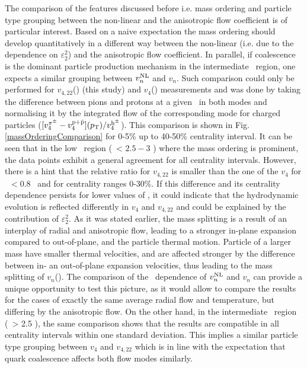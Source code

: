 The comparison of the features discussed before i.e. mass ordering and particle type grouping between the non-linear and the anisotropic flow coefficient is of particular interest.  Based on a naive expectation the mass ordering should develop quantitatively in a different way between the non-linear (i.e. due to the dependence on $\varepsilon_{2}^{2}$) and the anisotropic flow coefficient. In parallel, if coalescence is the dominant particle production mechanism in the intermediate \pT~region, one expects a similar grouping between $v_{n}^{\rm NL}$ and $v_{n}$. Such comparison could only be performed for $v_{4,22}$(\pT) (this study) and $v_{4}$(\pT) measurements \cite{Acharya:2018zuq} and was done by taking the difference between pions and protons at a given \pT~in both modes and normalising it by the integrated flow of the corresponding mode for charged particles \cite{Adam:2016izf} ($[v_{4}^{\pi^{\pm}} -  v_{4}^{\rm p+\bar{p}}](p_{\rm T}) / v_{4}^{\rm h^{\pm}}$). This comparison is shown in Fig. \ref{massOrderingComparison} for 0-5\% up to 40-50\% centrality interval. It can be seen that in the low \pT~region (\pT~< $2.5-3$ \GeV) where the mass ordering is prominent, the data points exhibit a general agreement for all centrality intervals. However, there is a hint that the relative ratio for $v_{4,22}$ is smaller than the one of the $v_{4}$ for \pT~$< 0.8$ \GeV~and for centrality ranges 0-30\%.
If this difference and its centrality dependence persists for lower values of \pT, it could indicate that the hydrodynamic evolution is reflected differently in $v_{4}$ and $v_{4,22}$ and could be explained by the contribution of $\varepsilon_{2}^{2}$.  As it was stated earlier, the mass splitting is a result of an interplay of radial and anisotropic flow, leading to a stronger in-plane expansion compared to out-of-plane, and the particle thermal motion. Particle of a larger mass have smaller thermal velocities, and are affected stronger by the difference between in- an out-of-plane expansion velocities, thus leading to the mass splitting of $v_{n}$(\pT). The comparison of the \pT~dependence of $v_{n}^{\rm NL}$ and $v_{n}$ can provide a unique opportunity to test this picture, as it would allow to compare the results for the cases of exactly the same average radial flow and temperature, but differing by the anisotropic flow. On the other hand, in the intermediate \pT~region (\pT~> 2.5 \GeV), the same comparison shows that the results are compatible in all centrality intervals within one standard deviation. This implies a similar particle type grouping between $v_{4}$ and $v_{4,22}$ which is in line with the expectation that quark coalescence affects both flow modes  similarly.
